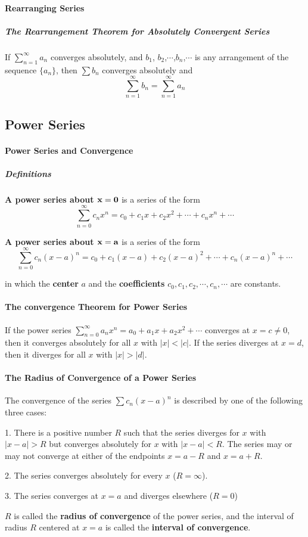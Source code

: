 \documentclass{article}
\begin{document}
            \paragraph{Rearranging Series}
                \subparagraph{The Rearrangement Theorem for Absolutely Convergent Series} If $\sum_{n=1}^\infty a_n$ converges absolutely, and $b_1$, $b_2$,$\cdots$,$b_n$,$\cdots$ is any arrangement of the sequence $\{a_n\}$, then $\sum b_n$ converges absolutely and
                \[\sum_{n=1}^\infty b_n=\sum_{n=1}^\infty a_n\]
        \subsection{Power Series}
            \paragraph{Power Series and Convergence}
                \subparagraph{Definitions} \textbf{A power series about $\bf{x=0}$} is a series of the form
                \[\sum_{n=0}^\infty c_n x^n=c_0+c_1x+c_2x^2+\cdots+c_nx^n+\cdots\]
                \par \textbf{A power series about $\bf{x=a}$} is a series of the form
                \[\sum_{n=0}^\infty c_n(x-a)^n=c_0+c_1(x-a)+c_2(x-a)^2+\cdots+c_n(x-a)^n+\cdots\]
                \par in which the \textbf{center} $a$ and the \textbf{coefficients} $c_0,c_1,c_2,\cdots,c_n,\cdots$ are constants.
            \paragraph{The convergence Theorem for Power Series} If the power series $\sum_{n=0}^\infty a_n x^n=a_0+a_1x+a_2x^2+\cdots$ converges at $x=c\ne 0$, then it converges absolutely for all $x$ with $|x|<|c|$. If the series diverges at $x=d$, then it diverges for all $x$ with $|x|>|d|$.
            \paragraph{The Radius of Convergence of a Power Series}
            The convergence of the series $\sum c_n(x-a)^n$ is described by one of the following three cases:
            \par 1. There is a positive number $R$ such that the series diverges for $x$ with $|x-a|>R$ but converges absolutely for $x$ with $|x-a|<R$. The series may or may not converge at either of the endpoints $x=a-R$ and $x=a+R$.
            \par 2. The series converges absolutely for every $x$ ($R=\infty$).
            \par 3. The series converges at $x=a$ and diverges elsewhere ($R=0$)\\
            \par  $R$ is called the \textbf{radius of convergence} of the power series, and the interval of radius $R$ centered at $x=a$ is called the \textbf{interval of convergence}.
\end{document}

